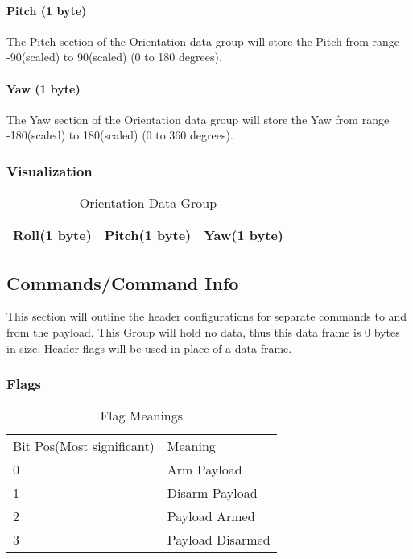 \documentclass{article}
\begin{document}
  \paragraph{Pitch (1 byte)}
  The Pitch section of the Orientation data group will store the Pitch from range -90(scaled) to 90(scaled) (0 to 180 degrees).  
  \paragraph{Yaw (1 byte)}
  The Yaw section of the Orientation data group will store the Yaw from range -180(scaled) to 180(scaled) (0 to 360 degrees).  
  
  \subsubsection{Visualization}
  \begin{table}[H]
  \centering
  \caption{Orientation Data Group}
  \label{Orientation}
  \begin{tabular}{|l|l|l|}
  \hline
Roll(1 byte) & Pitch(1 byte) & Yaw(1 byte) \\ \hline
  \end{tabular}
  \end{table}
  
 \pagebreak  
  
  \subsection{Commands/Command Info}
  This section will outline the header configurations for separate commands to and from the payload. This Group will hold no data, thus this data frame is 0 bytes in size. Header flags will be used in place of a data frame.
  \subsubsection{Flags}

  \begin{table}[h]
  \centering
  \caption{Flag Meanings}
  \begin{tabular}{ll}
    Bit Pos(Most significant) & Meaning \\
  0     & Arm Payload \\
  1     & Disarm Payload     \\
  2     & Payload Armed        \\
  3     & Payload Disarmed       \\
  \end{tabular}
  \end{table}
  
  
  
  
\end{document}
